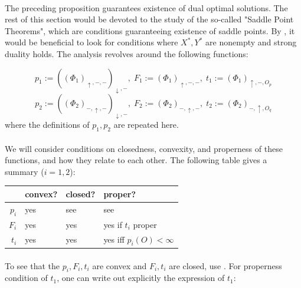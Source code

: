 \paragraph{}The preceding proposition guarantees existence of dual optimal solutions. The rest of this section would be devoted to the study of the so-called "Saddle Point Theorems", which are conditions guaranteeing existence of saddle points. By , it would be beneficial to look for conditions where $X^\ast,Y^\ast$ are nonempty and strong duality holds. The analysis revolves around the following functions:

\[
	p_1:=((\Phi_1)_{\uparrow, -,-})_{\downarrow,-},\;
	F_1:=(\Phi_1)_{\uparrow, -,-},\;
	t_1:=(\Phi_1)_{\uparrow, -,O_p}
\]
\[
	p_2:=((\Phi_2)_{-, \uparrow, -})_{\downarrow,-},\;
	F_2:=(\Phi_2)_{-, \uparrow, -},\;
	t_2:=(\Phi_2)_{-, \uparrow, O_q}
\]
where the definitions of $p_1,p_2$ are repeated here.

\paragraph{}We will consider conditions on closedness, convexity, and properness of these functions, and how they relate to each other. The following table gives a summary ($i=1,2$):

\begin{center}
	\begin{tabular}{|r||l|l|l|}
		\hline
		      & convex? & closed?                                       & proper?                                       \\\hline\hline
		$p_i$ & yes     & see \Cref{lemm:047-proper-closed-partial-inf} & see \Cref{lemm:047-proper-closed-partial-inf} \\\hline
		$F_i$ & yes     & yes                                           & yes if $t_i$ proper                           \\\hline
		$t_i$ & yes     & yes                                           & yes iff $p_i(O)<\infty$                       \\\hline
	\end{tabular}
\end{center}

\paragraph{}To see that the $p_i,F_i,t_i$ are convex and $F_i,t_i$ are closed, use . For properness condition of $t_1$, one can write out explicitly the expression of $t_1$:

